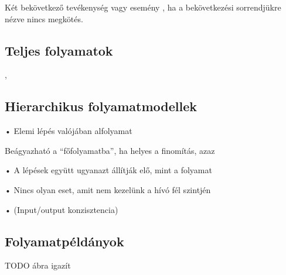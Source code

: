 \begin{definicio}
Két bekövetkező tevékenység vagy esemény , ha a bekövetkezési sorrendjükre nézve nincs megkötés.
\end{definicio} 


\subsection{Teljes folyamatok}


\begin{definicio}
	, 
\end{definicio}


\subsection{Hierarchikus folyamatmodellek}

\begin{definicio}
\end{definicio}

• Elemi lépés valójában alfolyamat



\begin{definicio}
\end{definicio}




Beágyazható a “főfolyamatba”, ha helyes a finomítás, azaz

• A lépések együtt ugyanazt állítják elő, mint a folyamat

• Nincs olyan eset, amit nem kezelünk a hívó fél szintjén

• (Input/output konzisztencia)


\subsection{Folyamatpéldányok}
TODO ábra igazít

